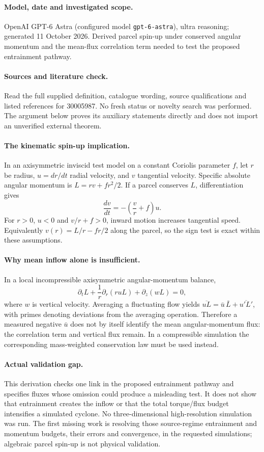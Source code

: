 \documentclass[11pt]{article}
\begin{document}
\paragraph{Model, date and investigated scope.}
OpenAI GPT-6 Astra (configured model \texttt{gpt-6-astra}), ultra reasoning; generated 11 October 2026. Derived parcel spin-up under conserved angular momentum and the mean-flux correlation term needed to test the proposed entrainment pathway.

\paragraph{Sources and literature check.}
Read the full supplied definition, catalogue wording, source qualifications and listed references for 30005987. No fresh status or novelty search was performed. The argument below proves its auxiliary statements directly and does not import an unverified external theorem.

\paragraph{The kinematic spin-up implication.} In an axisymmetric inviscid test model on a constant Coriolis parameter \(f\), let \(r\) be radius, \(u=dr/dt\) radial velocity, and \(v\) tangential velocity. Specific absolute angular momentum is \(L=rv+fr^2/2\). If a parcel conserves \(L\), differentiation gives
\[
 \frac{dv}{dt}=-\left(\frac vr+f\right)u.
\]
For \(r>0\), \(u<0\) and \(v/r+f>0\), inward motion increases tangential speed. Equivalently \(v(r)=L/r-fr/2\) along the parcel, so the sign test is exact within these assumptions.
\paragraph{Why mean inflow alone is insufficient.} In a local incompressible axisymmetric angular-momentum balance,
\[
 \partial_t L+\frac1r\partial_r(ruL)+\partial_z(wL)=0,
\]
where \(w\) is vertical velocity. Averaging a fluctuating flow yields \(\overline{uL}=\bar u\,\bar L+\overline{u'L'}\), with primes denoting deviations from the averaging operation. Therefore a measured negative \(\bar u\) does not by itself identify the mean angular-momentum flux: the correlation term and vertical flux remain. In a compressible simulation the corresponding mass-weighted conservation law must be used instead.
\paragraph{Actual validation gap.} This derivation checks one link in the proposed entrainment pathway and specifies fluxes whose omission could produce a misleading test. It does not show that entrainment creates the inflow or that the total torque/flux budget intensifies a simulated cyclone. No three-dimensional high-resolution simulation was run. The first missing work is resolving those source-regime entrainment and momentum budgets, their errors and convergence, in the requested simulations; algebraic parcel spin-up is not physical validation.
\end{document}
